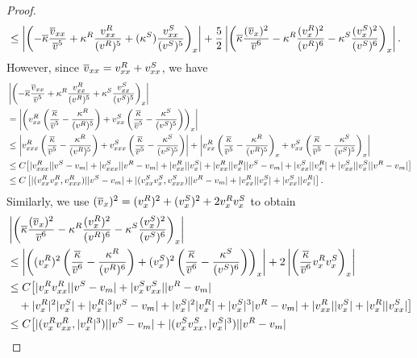 \documentclass[11pt,reqno]{amsart}
\begin{document}
\begin{proof}
\begin{align*}
        &\le \left| \left(  - \overline{\kappa} \frac{\overline{v}_{xx}}{\overline{v}^5} + \kappa^R \frac{v^R_{xx}}{(v^R)^5} +(\kappa^S)\frac{v^S_{xx}}{(v^S)^5} \right)_x \right| +\frac{5}{2} \left| \left( \overline{\kappa}  \frac{(\overline{v}_x)^2}{\overline{v}^6} -\kappa^R  \frac{(v^R_x)^2}{(v^R)^6} -\kappa^S  \frac{(v^S_x)^2}{(v^S)^6} \right)_x \right|.
    \end{align*}
    However, since $\overline{v}_{xx}=v^R_{xx}+v^S_{xx}$, we have
    \begin{align*}
        &\left| \left(  - \overline{\kappa} \frac{\overline{v}_{xx}}{\overline{v}^5} + \kappa^R \frac{v^R_{xx}}{(v^R)^5} +\kappa^S \frac{v^S_{xx}}{(v^S)^5} \right)_x \right|
        \\
        &=\left| \left( v^R_{xx} \left(\frac{\overline{\kappa}}{\overline{v}^5}-\frac{\kappa^R}{(v^R)^5} \right)+ v^S_{xx} \left(\frac{\overline{\kappa}}{\overline{v}^5}-\frac{\kappa^S}{(v^S)^5} \right) \right)_x \right|\\
        &\le \left| v^R_{xxx} \left(\frac{\overline{\kappa}}{\overline{v}^5}-\frac{\kappa^R}{(v^R)^5} \right)+ v^S_{xxx} \left(\frac{\overline{\kappa}}{\overline{v}^5}-\frac{\kappa^S}{(v^S)^5} \right) \right| +\left|  v^R_{xx} \left(\frac{\overline{\kappa}}{\overline{v}^5}-\frac{\kappa^R}{(v^R)^5} \right)_x+ v^S_{xx} \left(\frac{\overline{\kappa}}{\overline{v}^5}-\frac{\kappa^S}{(v^S)^5} \right)_x \right| \\
        &\le C \big[ |v^R_{xxx}| | v^S-v_m| + |v^S_{xxx}| |v^R-v_m| +  |v^R_{xx}| |v^S_x| +  |v^R_{xx}| |v^R_x| |v^S-v_m| +  |v^S_{xx}| |v^R_x| + |v^S_{xx}| |v^S_x| |v^R-v_m| \big]\\
        &\le C\left[ |(v^R_{xx}v^R_x,v^R_{xxx})| |v^S-v_m| + |(v^S_{xx}v^S_x,v^S_{xxx})| | v^R-v_m| + |v^R_{xx}||v^S_x|+|v^S_{xx}||v^R_x|\right].
    \end{align*}
    Similarly, we use   $(\overline{v}_{x})^2=(v^R_{x})^2+(v^S_{x})^2+2 v^R_x v^S_x$ to obtain
    \begin{align*}
        &\left| \left( \ok  \frac{(\ov_x)^2}{\ov^6} -\kr  \frac{(\vr_x)^2}{(\vr)^6} -\ks  \frac{(\vs_x)^2}{(\vs)^6} \right)_x \right|\\
        &\le \left| \left( (\vr_{x})^2 \left(\frac{\ok}{\ov^6}-\frac{\kr}{(\vr)^6} \right)+ (\vs_{x})^2 \left(\frac{\ok}{\ov^6}-\frac{\ks}{(\vs)^6} \right) \right)_x \right|  +2 \left|   \left( \frac{\ok}{\ov^6}\vr_x\vs_x  \right)_x \right| \\
        &\le C \big[  |\vr_{x}\vr_{xx}| | \vs-v_m| + |\vs_{x}\vs_{xx}| | \vr-v_m|  \\ 
        &\quad +  |\vr_{x}|^2 |\vs_x| +  |\vr_{x}|^3  |\vs-v_m| +  |\vs_{x}|^2 |\vr_x| +  |\vs_{x}|^3  |\vr-v_m| + |\vr_{xx}| |\vs_x| + |\vr_{x}| |\vs_{xx}|\big] \\
        &\le C\big[ | (\vr_x\vr_{xx},|\vr_x|^3 ) | |\vs-v_m| + | (\vs_x\vs_{xx},|\vs_x|^3 ) | |\vr-v_m| \\ 

\end{align*}
\end{proof}
\end{document}
